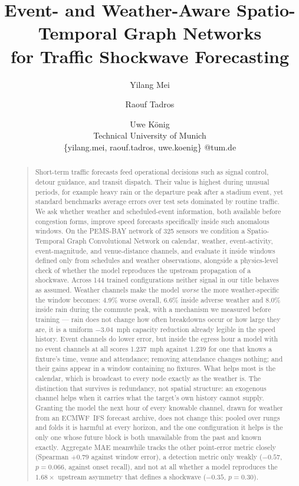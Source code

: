 \documentclass[letterpaper]{article}
\title{Event- and Weather-Aware Spatio-Temporal Graph Networks\\for Traffic Shockwave Forecasting}
\author{Yilang Mei \and Raouf Tadros \and Uwe K\"onig\\
Technical University of Munich\\
\{yilang.mei, raouf.tadros, uwe.koenig\} @tum.de
}
\begin{document}
\maketitle

\begin{abstract}
\begin{quote}
Short-term traffic forecasts feed operational decisions such as signal control, detour guidance, and transit dispatch. Their value is highest during unusual periods, for example heavy rain or the departure peak after a stadium event, yet standard benchmarks average errors over test sets dominated by routine traffic. We ask whether weather and scheduled-event information, both available before congestion forms, improve speed forecasts specifically inside such anomalous windows. On the PEMS-BAY network of 325 sensors we condition a Spatio-Temporal Graph Convolutional Network on calendar, weather, event-activity, event-magnitude, and venue-distance channels, and evaluate it inside windows defined only from schedules and weather observations, alongside a physics-level check of whether the model reproduces the upstream propagation of a shockwave. Across 144 trained configurations neither signal in our title behaves as assumed. Weather channels make the model \emph{worse} the more weather-specific the window becomes: 4.9\% worse overall, 6.6\% inside adverse weather and 8.0\% inside rain during the commute peak, with a mechanism we measured before training --- rain does not change how often breakdowns occur or how large they are, it is a uniform $-3.04$~mph capacity reduction already legible in the speed history. Event channels do lower error, but inside the egress hour a model with no event channels at all scores 1.237~mph against 1.239 for one that knows a fixture's time, venue and attendance; removing attendance changes nothing; and their gains appear in a window containing no fixtures. What helps most is the calendar, which is broadcast to every node exactly as the weather is. The distinction that survives is redundancy, not spatial structure: an exogenous channel helps when it carries what the target's own history cannot supply. Granting the model the next hour of every knowable channel, drawn for weather from an ECMWF~IFS forecast archive, does not change this: pooled over rungs and folds it is harmful at every horizon, and the one configuration it helps is the only one whose future block is both unavailable from the past and known exactly. Aggregate MAE meanwhile tracks the other point-error metric closely (Spearman $+0.79$ against window error), a detection metric only weakly ($-0.57$, $p=0.066$, against onset recall), and not at all whether a model reproduces the $1.68\times$ upstream asymmetry that defines a shockwave ($-0.35$, $p=0.30$).
\end{quote}
\end{abstract}
\end{document}
